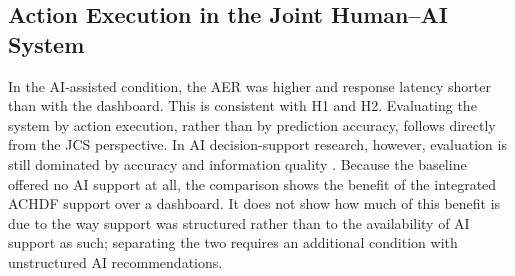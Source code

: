 \documentclass[journal]{IEEEtran}
\theoremstyle{plain}
\theoremstyle{definition}
\providecommand{\DIFaddtex}[1]{{\protect\color{blue} \sf #1}} %
\providecommand{\DIFaddbegin}{} %
\providecommand{\DIFaddend}{} %
\providecommand{\DIFdelbegin}{} %
\providecommand{\DIFdelend}{} %
\providecommand{\DIFadd}[1]{\texorpdfstring{\DIFaddtex{#1}}{#1}} %
\newcommand{\DIFscaledelfig}{0.5}
\newlength{\DIFdelgraphicswidth} %
\newlength{\DIFdelgraphicsheight} %
\newcommand{\DIFaddincludegraphics}[2][]{{\color{blue}\fbox{\DIFOincludegraphics[#1]{#2}}}} %
\newcommand{\DIFdelincludegraphics}[2][]{%
\sbox{\DIFdelgraphicsbox}{\DIFOincludegraphics[#1]{#2}}%
\settoboxwidth{\DIFdelgraphicswidth}{\DIFdelgraphicsbox} %
\settoboxtotalheight{\DIFdelgraphicsheight}{\DIFdelgraphicsbox} %
\scalebox{\DIFscaledelfig}{%
\parbox[b]{\DIFdelgraphicswidth}{\usebox{\DIFdelgraphicsbox}\\[-\baselineskip] \rule{\DIFdelgraphicswidth}{0em}}\llap{\resizebox{\DIFdelgraphicswidth}{\DIFdelgraphicsheight}{%
\setlength{\unitlength}{\DIFdelgraphicswidth}%
\begin{picture}(1,1)%
\thicklines\linethickness{2pt} %
{\color[rgb]{1,0,0}\put(0,0){\framebox(1,1){}}}%
{\color[rgb]{1,0,0}\put(0,0){\line( 1,1){1}}}%
{\color[rgb]{1,0,0}\put(0,1){\line(1,-1){1}}}%
\end{picture}%
}\hspace*{3pt}}} %
} %
\DeclareRobustCommand{\DIFaddbegin}{\DIFOaddbegin \let\includegraphics\DIFaddincludegraphics} %
\DeclareRobustCommand{\DIFaddend}{\DIFOaddend \let\includegraphics\DIFOincludegraphics} %
\DeclareRobustCommand{\DIFdelbegin}{\DIFOdelbegin \let\includegraphics\DIFdelincludegraphics} %
\DeclareRobustCommand{\DIFdelend}{\DIFOaddend \let\includegraphics\DIFOincludegraphics} %
\begin{document}
\DIFdelbegin %
\DIFdelend \DIFaddbegin \subsection{\DIFadd{Action Execution in the Joint Human--AI System}}
\DIFadd{In the AI-assisted condition, the AER was higher and response latency shorter than with the dashboard. This is consistent with H1 and H2. Evaluating the system by action execution, rather than by prediction accuracy, follows directly from the JCS perspective. In AI decision-support research, however, evaluation is still dominated by accuracy and information quality \cite{Lai2023FAccT,Muller2022CHIWORK,Yang2022THMSReview}. Because the baseline offered no AI support at all, the comparison shows the benefit of the integrated ACHDF support over a dashboard. It does not show how much of this benefit is due to the way support was structured rather than to the availability of AI support as such; separating the two requires an additional condition with unstructured AI recommendations.
}\DIFaddend 
\end{document}
